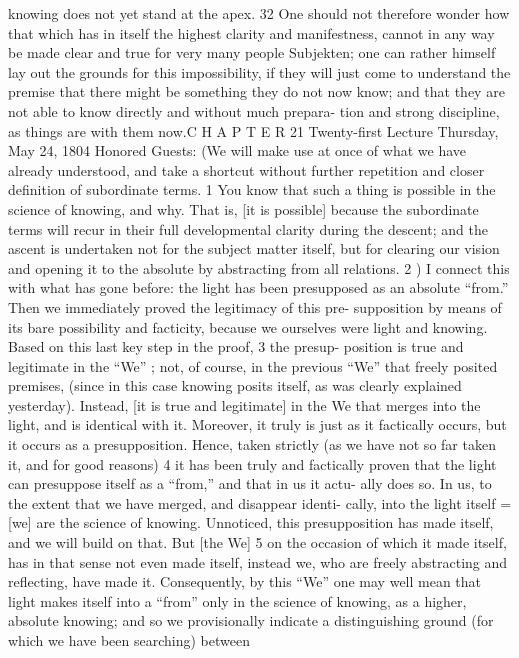 knowing does not yet stand at the apex. 32 One should not therefore wonder
how that which has in itself the highest clarity and manifestness, cannot in
any way be made clear and true for very many people {Subjekten}; one can
rather himself lay out the grounds for this impossibility, if they will just come
to understand the premise that there might be something they do not now
know; and that they are not able to know directly and without much prepara-
tion and strong discipline, as things are with them now.C H A P T E R
21
Twenty-first Lecture
Thursday, May 24, 1804
Honored Guests:
(We will make use at once of what we have already understood, and take a
shortcut without further repetition and closer definition of subordinate
terms. 1 You know that such a thing is possible in the science of knowing, and
why. That is, [it is possible] because the subordinate terms will recur in their
full developmental clarity during the descent; and the ascent is undertaken not
for the subject matter itself, but for clearing our vision and opening it to the
absolute by abstracting from all relations. 2 )
I connect this with what has gone before: the light has been presupposed
as an absolute “from.” Then we immediately proved the legitimacy of this pre-
supposition by means of its bare possibility and facticity, because we ourselves
were light and knowing. Based on this last key step in the proof, 3 the presup-
position is true and legitimate in the “We” ; not, of course, in the previous “We”
that freely posited premises, (since in this case knowing posits itself, as was
clearly explained yesterday). Instead, [it is true and legitimate] in the We that
merges into the light, and is identical with it. Moreover, it truly is just as it
factically occurs, but it occurs as a presupposition. Hence, taken strictly (as we
have not so far taken it, and for good reasons) 4 it has been truly and factically
proven that the light can presuppose itself as a “from,” and that in us it actu-
ally does so. In us, to the extent that we have merged, and disappear identi-
cally, into the light itself = [we] are the science of knowing. Unnoticed, this
presupposition has made itself, and we will build on that. But [the We] 5 on the
occasion of which it made itself, has in that sense not even made itself, instead
we, who are freely abstracting and reflecting, have made it. Consequently, by
this “We” one may well mean that light makes itself into a “from” only in the
science of knowing, as a higher, absolute knowing; and so we provisionally
indicate a distinguishing ground (for which we have been searching) between
